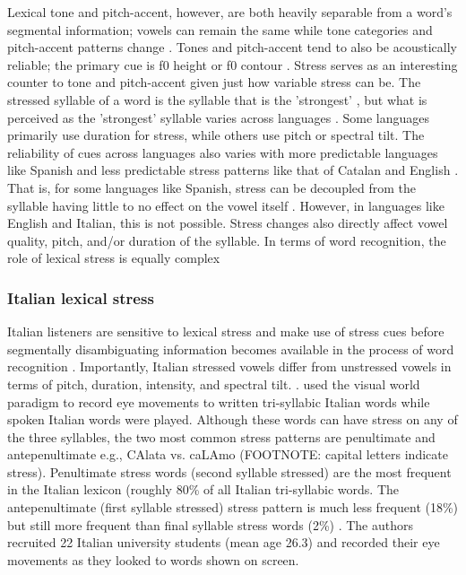 Lexical tone and pitch-accent, however, are both heavily separable from a word's segmental information; vowels can remain the same while tone categories and pitch-accent patterns change \citep{Zeng2017}. Tones and pitch-accent tend to also be acoustically reliable; the primary cue is f0 height or f0 contour \citep{goss_2014}.  Stress serves as an interesting counter to tone and pitch-accent given just how variable stress can be. The stressed syllable of a word is the syllable that is the 'strongest' \citep{sluijter1996spectral}, but what is perceived as the 'strongest' syllable varies across languages \citep{Cutler1988}. Some languages primarily use duration for stress, while others use pitch or spectral tilt. The reliability of cues across languages also varies with more predictable languages like Spanish and less predictable stress patterns like that of Catalan and English \citep{ortega_2011, beckman_1994}. That is, for some languages like Spanish, stress can be decoupled from the syllable having little to no effect on the vowel itself \citep{ortega_2011}. However, in languages like English and Italian, this is not possible. Stress changes also directly affect vowel quality, pitch, and/or duration of the syllable. In terms of word recognition, the role of lexical stress is equally complex \citep{cutler2001voornaam,Reinisch2010}

\subsubsection{Italian lexical stress}
Italian listeners are sensitive to lexical stress and make use of stress cues before segmentally disambiguating information becomes available in the process of word recognition \cite{Tagliapietra2005, Sulpizio_McQueen_2012}. Importantly, Italian stressed vowels differ from unstressed vowels in terms of pitch, duration, intensity, and spectral tilt. \citep{Maturi1998}. \cite{Sulpizio_McQueen_2012} used the visual world paradigm to record eye movements to written tri-syllabic Italian words while spoken Italian words were played. Although these words can have stress on any of the three syllables, the two most common stress patterns are penultimate and antepenultimate e.g., CAlata vs. caLAmo (FOOTNOTE: capital letters indicate stress). Penultimate stress words (second syllable stressed) are the most frequent in the Italian lexicon (roughly 80\% of all Italian tri-syllabic words. The antepenultimate (first syllable stressed) stress pattern is much less frequent (18\%) but still more frequent than final syllable stress words (2\%) \citep{thornton_1997}. The authors recruited 22 Italian university students (mean age 26.3) and recorded their eye movements as they looked to words shown on screen.

